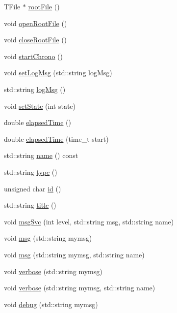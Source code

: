 \begin{DoxyCompactItemize}
\item 
TFile $\ast$ \hyperlink{classProcessus_a247e8c362ec08422cf53d08dd23b093c}{rootFile} ()
\item 
void \hyperlink{classProcessus_aacf6812880c1d1a2bf14a4a39458f443}{openRootFile} ()
\item 
void \hyperlink{classProcessus_a2f3c41e99da4c738ea3d8f7b0d20a665}{closeRootFile} ()
\item 
void \hyperlink{classProcessus_a5e4d34b86241fa0756e07375a14ff4b2}{startChrono} ()
\item 
void \hyperlink{classProcessus_a471833f89047aa9a7ff6200a31c17a1d}{setLogMsg} (std::string logMsg)
\item 
std::string \hyperlink{classProcessus_a42fdeb17dc13ba854222666b6aa29b61}{logMsg} ()
\item 
void \hyperlink{classProcessus_ad38cde0f1bcefa00b068e7947b8af927}{setState} (int state)
\item 
double \hyperlink{classProcessus_aecca96218c65bc805c988cd95447df55}{elapsedTime} ()
\item 
double \hyperlink{classProcessus_a06d3815ad56593dfd0d3c1f534f8b146}{elapsedTime} (time\_\-t start)
\item 
std::string \hyperlink{classObject_a975e888d50bfcbffda2c86368332a5cd}{name} () const 
\item 
std::string \hyperlink{classObject_a84f99f70f144a83e1582d1d0f84e4e62}{type} ()
\item 
unsigned char \hyperlink{classObject_af99145335cc61ff6e2798ea17db009d2}{id} ()
\item 
std::string \hyperlink{classObject_a73a0f1a41828fdd8303dd662446fb6c3}{title} ()
\item 
void \hyperlink{classObject_a3f9d5537ebce0c0f2bf6ae4d92426f3c}{msgSvc} (int level, std::string msg, std::string name)
\item 
void \hyperlink{classObject_a58b2d0618c2d08cf2383012611528d97}{msg} (std::string mymsg)
\item 
void \hyperlink{classObject_ac5d59299273cee27aacf7de00d2e7034}{msg} (std::string mymsg, std::string name)
\item 
void \hyperlink{classObject_a83d2db2df682907ea1115ad721c1c4a1}{verbose} (std::string mymsg)
\item 
void \hyperlink{classObject_a2d4120195317e2a3c6532e8bb9f3da68}{verbose} (std::string mymsg, std::string name)
\item 
void \hyperlink{classObject_aac010553f022165573714b7014a15f0d}{debug} (std::string mymsg)

\end{DoxyCompactItemize}
